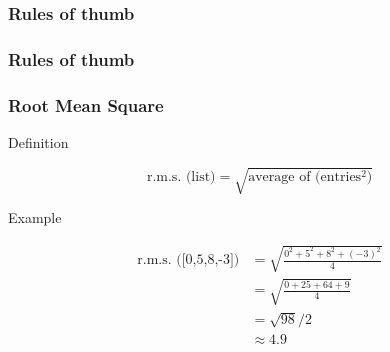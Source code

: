 \documentclass[handout]{beamer}
\begin{document}
   \begin{frame}
   \frametitle{Rules of thumb}
   \begin{center}
   \end{center}

   \end{frame}



   \begin{frame}
   \frametitle{Rules of thumb}
   \begin{center}
   \end{center}

   \end{frame}


   \begin{frame} \frametitle{Root Mean Square}

   \begin{block}
   {Definition}

   $$
   \text{r.m.s. (list)} = \sqrt{\text{average of (entries$^2$)}}
   $$


   \end{block}


   \begin{block}
   {Example}

   $$
   \begin{aligned}
   \text{r.m.s. ([0,5,8,-3])} &= \sqrt{\frac{0^2+5^2+8^2+(-3)^2}{4}} \\
   &= \sqrt{\frac{0+25+64+9}{4}} \\
   &= \sqrt{98} / 2 \\
   & \approx 4.9
   \end{aligned}
   $$


   \end{block}
   \end{frame}
\end{document}
